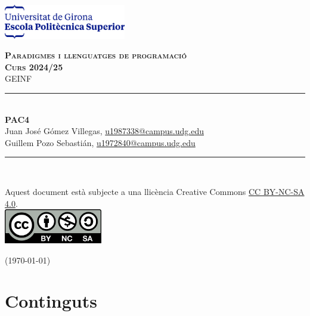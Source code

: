 \documentclass[10pt,a4paper]{article}
\begin{document}
    \begin{titlepage}
        \newcommand{\HRule}{\rule{\linewidth}{0.5mm}} %
        \begin{flushleft}
            \includegraphics[height=1.5cm]{EPS.png}\\\vfill
        \end{flushleft}
        \center %
        \textsc{\huge \bfseries Paradigmes i llenguatges de programació }\\[0.25cm]
        \textsc{\Large \bfseries Curs 2024/25}\\[0.25cm]
        \textsc{\large GEINF }
        \HRule \\[0.4cm]
        { \huge \bfseries PAC4} \\[0.4cm] %
{Juan José Gómez Villegas, \href{mailto:u1987338@campus.udg.edu}{u1987338@campus.udg.edu}} \\ {Guillem Pozo Sebastián, \href{mailto:u1972840@campus.udg.edu}{u1972840@campus.udg.edu}}
        \HRule \\\vfill
        \begin{minipage}{0.4\textwidth}
            \begin{flushleft}
		\footnotesize{Aquest document està subjecte a una llicència Creative Commons \href{https://creativecommons.org/licenses/by-nc-sa/4.0/?ref=chooser-v1}{CC BY-NC-SA 4.0}.} \\\vfill
		\includegraphics[height=1.5cm]{CC_license.png}
            \end{flushleft}
        \end{minipage}
        \hfill
        \begin{minipage}{0.4\textwidth}
            \begin{flushright} \large
                {\small (\today)}
            \end{flushright}
        \end{minipage}
    \end{titlepage}


\tableofcontents

\clearpage

\section{Continguts}
\end{document}
